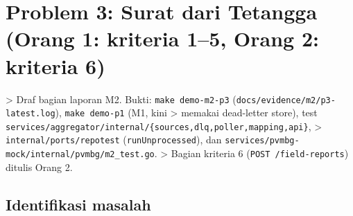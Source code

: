 \chapter{Problem 3: Surat dari Tetangga (Orang 1: kriteria 1--5, Orang 2: kriteria 6)}

> Draf bagian laporan M2. Bukti: \texttt{make demo-\allowbreak{}m2-\allowbreak{}p3} (\texttt{docs/\allowbreak{}evidence/\allowbreak{}m2/\allowbreak{}p3-\allowbreak{}latest.\allowbreak{}log}), \texttt{make demo-\allowbreak{}p1} (M1, kini > memakai dead-letter store), test \texttt{services/\allowbreak{}aggregator/\allowbreak{}internal/\allowbreak{}\{sources,\allowbreak{}dlq,\allowbreak{}poller,\allowbreak{}mapping,\allowbreak{}api\}}, > \texttt{internal/\allowbreak{}ports/\allowbreak{}repotest} (\texttt{run\allowbreak{}Unprocessed}), dan \texttt{services/\allowbreak{}pvmbg-\allowbreak{}mock/\allowbreak{}internal/\allowbreak{}pvmbg/\allowbreak{}m2\_\allowbreak{}test.\allowbreak{}go}. > Bagian kriteria 6 (\texttt{POST /\allowbreak{}field-\allowbreak{}reports}) ditulis Orang 2.


\section{Identifikasi masalah}

